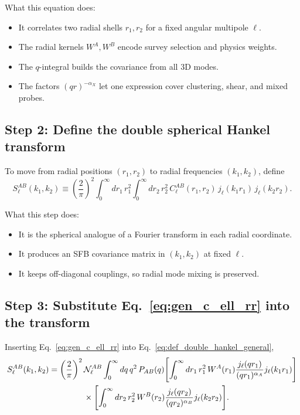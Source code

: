 What this equation does:
\begin{itemize}
\item It correlates two radial shells $r_1,r_2$ for a fixed angular multipole $\ell$.
\item The radial kernels $W^A,W^B$ encode survey selection and physics weights.
\item The $q$-integral builds the covariance from all 3D modes.
\item The factors $(qr)^{-\alpha_X}$ let one expression cover clustering,
shear, and mixed probes.
\end{itemize}

\subsection{Step 2: Define the double spherical Hankel transform}

To move from radial positions $(r_1,r_2)$ to radial frequencies $(k_1,k_2)$,
define
\begin{equation}
S_\ell^{AB}(k_1,k_2)
\equiv \left(\frac{2}{\pi}\right)^2
\int_0^{\infty} dr_1\,r_1^2
\int_0^{\infty} dr_2\,r_2^2\,
C_\ell^{AB}(r_1,r_2)\,j_\ell(k_1r_1)\,j_\ell(k_2r_2).
\label{eq:def_double_hankel_general}
\end{equation}

What this step does:
\begin{itemize}
\item It is the spherical analogue of a Fourier transform in each radial coordinate.
\item It produces an SFB covariance matrix in $(k_1,k_2)$ at fixed $\ell$.
\item It keeps off-diagonal couplings, so radial mode mixing is preserved.
\end{itemize}

\subsection{Step 3: Substitute Eq.~\eqref{eq:gen_c_ell_rr} into the transform}

Inserting Eq.~\eqref{eq:gen_c_ell_rr} into Eq.~\eqref{eq:def_double_hankel_general},
\begin{align}
S_\ell^{AB}(k_1,k_2)
&= \left(\frac{2}{\pi}\right)^2\mathcal N_\ell^{AB}
\int_0^{\infty} dq\,q^2\,P_{AB}(q)
\Biggl[\int_0^{\infty} dr_1\,r_1^2\,W^A(r_1)
\frac{j_\ell(qr_1)}{(qr_1)^{\alpha_A}}j_\ell(k_1r_1)\Biggr]
\nonumber\\
&\hspace{1.5cm}\times
\Biggl[\int_0^{\infty} dr_2\,r_2^2\,W^B(r_2)
\frac{j_\ell(qr_2)}{(qr_2)^{\alpha_B}}j_\ell(k_2r_2)\Biggr].
\label{eq:inserted_general}
\end{align}

